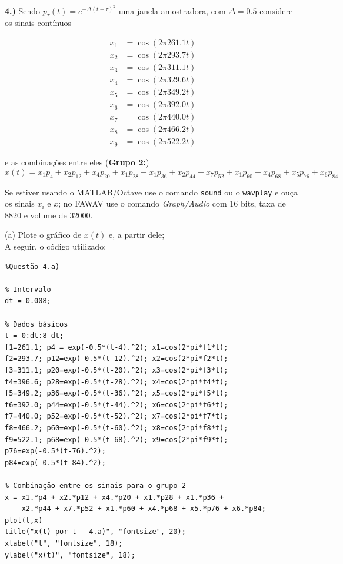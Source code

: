 \documentclass[10pt]{article}
\begin{document}
\vspace{\baselineskip}


\textbf{4.)} Sendo $p_{\tau}(t) = e^{-\Delta (t - \tau)^2}$ uma janela amostradora, com $\Delta = 0.5$ considere os sinais contínuos

\begin{flushleft}
\begin{align*}
    x_1 &= \cos(2 \pi 261.1 t)\\
    x_2 &= \cos(2 \pi 293.7 t)\\
    x_3 &= \cos(2 \pi 311.1 t)\\
    x_4 &= \cos(2 \pi 329.6 t)\\
    x_5 &= \cos(2 \pi 349.2 t)\\
    x_6 &= \cos(2 \pi 392.0 t)\\
    x_7 &= \cos(2 \pi 440.0 t)\\
    x_8 &= \cos(2 \pi 466.2 t)\\
    x_9 &= \cos(2 \pi 522.2 t)
\end{align*}
\end{flushleft}
e as combinações entre eles (\textbf{Grupo 2:})
\[x(t) = x_1p_4 + x_2p_{12} + x_4p_{20} + x_1p_{28} + x_1p_{36} + x_2p_{44} + x_7p_{52} + x_1p_{60} + x_4p_{68} + x_5p_{76} + x_6p_{84}\]

Se estiver usando o MATLAB/Octave use o comando \texttt{sound} ou o \texttt{wavplay} e ouça os sinais $x_i$ e $x$; no FAWAV use o comando \emph{Graph/Audio} com 16 bits, taxa de 8820 e volume de 32000.

(a) Plote o gráfico de $x(t)$ e, a partir dele;\\
A seguir, o código utilizado:

\begin{verbatim}
%Questão 4.a)

% Intervalo
dt = 0.008;

% Dados básicos
t = 0:dt:8-dt;
f1=261.1; p4 = exp(-0.5*(t-4).^2); x1=cos(2*pi*f1*t);
f2=293.7; p12=exp(-0.5*(t-12).^2); x2=cos(2*pi*f2*t);
f3=311.1; p20=exp(-0.5*(t-20).^2); x3=cos(2*pi*f3*t);
f4=396.6; p28=exp(-0.5*(t-28).^2); x4=cos(2*pi*f4*t);
f5=349.2; p36=exp(-0.5*(t-36).^2); x5=cos(2*pi*f5*t);
f6=392.0; p44=exp(-0.5*(t-44).^2); x6=cos(2*pi*f6*t);
f7=440.0; p52=exp(-0.5*(t-52).^2); x7=cos(2*pi*f7*t);
f8=466.2; p60=exp(-0.5*(t-60).^2); x8=cos(2*pi*f8*t);
f9=522.1; p68=exp(-0.5*(t-68).^2); x9=cos(2*pi*f9*t);
p76=exp(-0.5*(t-76).^2); 
p84=exp(-0.5*(t-84).^2);

% Combinação entre os sinais para o grupo 2
x = x1.*p4 + x2.*p12 + x4.*p20 + x1.*p28 + x1.*p36 + 
    x2.*p44 + x7.*p52 + x1.*p60 + x4.*p68 + x5.*p76 + x6.*p84;
plot(t,x)
title("x(t) por t - 4.a)", "fontsize", 20);
xlabel("t", "fontsize", 18);
ylabel("x(t)", "fontsize", 18);



\end{verbatim}
\end{document}
